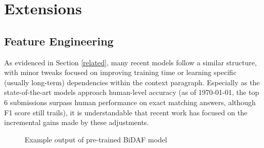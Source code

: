 \documentclass{article}
\begin{document}
\section{Extensions} \label{extensions}
\subsection{Feature Engineering}
As evidenced in Section \ref{related}, many recent models follow a similar structure, with minor tweaks focused on improving training time or learning specific (usually long-term) dependencies within the context paragraph. Especially as the state-of-the-art models approach human-level accuracy (as of \today, the top 6 submissions surpass human performance on exact matching answers, although F1 score still trails), it is understandable that recent work has focused on the incremental gains made by these adjustments. 

\begin{figure}[h]
	\centering
	\qquad
	\caption[caption]{Example output of pre-trained BiDAF model\footnotemark}
	\label{fig:allenDemo}
\end{figure}
\end{document}

